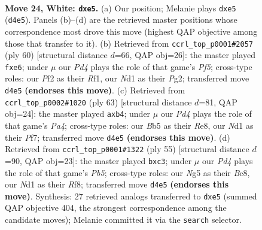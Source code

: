 \documentclass[11pt]{article}
\begin{document}
\clearpage

\begin{figure}[p]\centering
\begin{subfigure}{0.46\textwidth}\centering
\resizebox{\linewidth}{!}{%
\newchessgame
\chessboard[
  setfen={1nb2r1k/8/1p2p1p1/1B2qpN1/3P2p1/8/r1P2PP1/2RN1K2 w - - 0 24},
  showmover=false,
  pgfstyle=straightmove, color=movearrow, markmove={d4-e5}
]}
\caption{}
\end{subfigure}\hfill
\begin{subfigure}{0.46\textwidth}\centering
\resizebox{\linewidth}{!}{%
\newchessgame
\chessboard[
  setfen={r5k1/6p1/3Pqp1p/p1B2P2/Pp6/1b5P/1P4P1/5RK1 w - - 0 31},
  showmover=false,
  pgfstyle=straightmove, color=movearrow, markmove={f5-e6}
]}
\caption{}
\end{subfigure}
\\[4pt]
\begin{subfigure}{0.46\textwidth}\centering
\resizebox{\linewidth}{!}{%
\newchessgame
\chessboard[
  setfen={4r1k1/5p2/b4np1/p2Pp2p/NQ2P3/6PP/5PB1/2R3K1 b - - 0 32},
  showmover=false,
  pgfstyle=straightmove, color=movearrow, markmove={a5-b4}
]}
\caption{}
\end{subfigure}\hfill
\begin{subfigure}{0.46\textwidth}\centering
\resizebox{\linewidth}{!}{%
\newchessgame
\chessboard[
  setfen={2b2rk1/5p1p/1n4p1/2pP4/1p6/1PQ3NP/4BPP1/3R2K1 b - - 0 28},
  showmover=false,
  pgfstyle=straightmove, color=movearrow, markmove={b4-c3}
]}
\caption{}
\end{subfigure}
\caption{\textbf{Move 24, White: \texttt{dxe5}.} (a) Our position; Melanie plays \texttt{dxe5} (\texttt{d4e5}). Panels (b)--(d) are the retrieved master positions whose correspondence most drove this move (highest QAP objective among those that transfer to it). (b) Retrieved from \texttt{ccrl\_top\_p0001\#2057} (ply 60) [structural distance $d$=66, QAP obj=26]: the master played \texttt{fxe6}; under $\mu$ our \emph{Pd4} plays the role of that game's \emph{Pf5}; cross-type roles: our \emph{P}f2 as their \emph{R}f1, our \emph{N}d1 as their \emph{P}g2; transferred move \texttt{d4e5} \textbf{(endorses this move)}. (c) Retrieved from \texttt{ccrl\_top\_p0002\#1020} (ply 63) [structural distance $d$=81, QAP obj=24]: the master played \texttt{axb4}; under $\mu$ our \emph{Pd4} plays the role of that game's \emph{Pa4}; cross-type roles: our \emph{B}b5 as their \emph{R}e8, our \emph{N}d1 as their \emph{P}f7; transferred move \texttt{d4e5} \textbf{(endorses this move)}. (d) Retrieved from \texttt{ccrl\_top\_p0001\#1322} (ply 55) [structural distance $d$=90, QAP obj=23]: the master played \texttt{bxc3}; under $\mu$ our \emph{Pd4} plays the role of that game's \emph{Pb5}; cross-type roles: our \emph{N}g5 as their \emph{B}c8, our \emph{N}d1 as their \emph{R}f8; transferred move \texttt{d4e5} \textbf{(endorses this move)}. Synthesis: 27 retrieved analogs transferred to \texttt{dxe5} (summed QAP objective 404, the strongest correspondence among the candidate moves); Melanie committed it via the \texttt{search} selector.}
\label{fig:thought-m46}
\end{figure}
\end{document}
